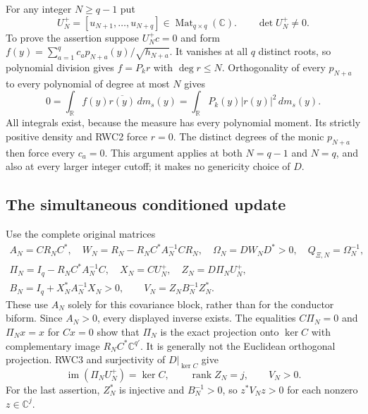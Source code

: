 \documentclass[11pt,a4paper]{article}
\begin{document}
For any integer $N\ge q-1$ put
\begin{equation}\tag{RWC3}
U_N^+=[u_{N+1},\ldots,u_{N+q}]\in\operatorname{Mat}_{q\times q}(\mathbb C).
\qquad \det U_N^+\ne0.
\end{equation}
To prove the assertion suppose $U_N^+c=0$ and form
$f(y)=\sum_{a=1}^q c_a p_{N+a}(y)/\sqrt{h_{N+a}}$.
It vanishes at all $q$ distinct roots, so polynomial division gives
$f=P_k r$ with $\deg r\le N$. Orthogonality of every $p_{N+a}$
to every polynomial of degree at most $N$ gives
\[
0=\int_{\mathbb R}f(y)\overline{r(y)}\,dm_s(y)
 =\int_{\mathbb R}P_k(y)|r(y)|^2\,dm_s(y).
\]
All integrals exist, because the measure has every polynomial moment.
Its strictly positive density and RWC2 force $r=0$. The distinct
degrees of the monic $p_{N+a}$ then force every $c_a=0$.
This argument applies at both $N=q-1$ and $N=q$, and also at
every larger integer cutoff; it makes no genericity choice of $D$.

\subsection{The simultaneous conditioned update}
Use the complete original matrices
\begin{equation}\tag{RWC4}
\begin{gathered}
A_N=CR_NC^*,\quad
W_N=R_N-R_NC^*A_N^{-1}CR_N,\quad
\Omega_N=DW_ND^*>0,\quad Q_{\Xi,N}=\Omega_N^{-1},\\
\Pi_N=I_q-R_NC^*A_N^{-1}C,\quad
X_N=CU_N^+,\quad Z_N=D\Pi_N U_N^+,\\
B_N=I_q+X_N^*A_N^{-1}X_N>0,\qquad
V_N=Z_NB_N^{-1}Z_N^*.
\end{gathered}
\end{equation}
These use $A_N$ solely for this covariance block, rather than for
the conductor biform. Since $A_N>0$, every displayed inverse exists.
The equalities $C\Pi_N=0$ and $\Pi_Nx=x$ for $Cx=0$ show that
$\Pi_N$ is the exact projection onto $\ker C$ with complementary
image $R_NC^*\mathbb C^{q'}$. It is generally not the Euclidean
orthogonal projection. RWC3 and surjectivity of $D|_{\ker C}$ give
\begin{equation}\tag{RWC5}
\operatorname{im}(\Pi_N U_N^+)=\ker C,\qquad
\operatorname{rank}Z_N=j,\qquad V_N>0.
\end{equation}
For the last assertion, $Z_N^*$ is injective and $B_N^{-1}>0$,
so $z^*V_Nz>0$ for each nonzero $z\in\mathbb C^j$.
\end{document}
